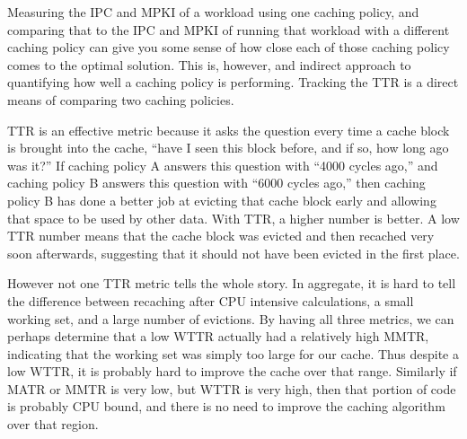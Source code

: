 Measuring the IPC and MPKI of a workload using one caching policy,
 and comparing that to the IPC and MPKI of running that workload with a different caching policy can give you some sense of how close each of those caching policy comes to the optimal solution.
This is, however, and indirect approach to quantifying how well a caching policy is performing.
Tracking the TTR is a direct means of comparing two caching policies.

TTR is an effective metric because it asks the question every time a cache block is brought into the cache,
 ``have I seen this block before, and if so, how long ago was it?''
If caching policy A answers this question with ``4000 cycles ago,''
 and caching policy B answers this question with ``6000 cycles ago,''
 then caching policy B has done a better job at evicting that cache block early and allowing that space to be used by other data.
With TTR, a higher number is better.
A low TTR number means that the cache block was evicted and then recached very soon afterwards,
 suggesting that it should not have been evicted in the first place.

However not one TTR metric tells the whole story.
In aggregate, it is hard to tell the difference between recaching after CPU intensive calculations, a small working set, and a large number of evictions.
By having all three metrics, we can perhaps determine that a low WTTR actually had a relatively high MMTR, indicating that the working set was simply too large for our cache.
Thus despite a low WTTR, it is probably hard to improve the cache over that range.
Similarly if MATR or MMTR is very low, but WTTR is very high, then that portion of code is probably CPU bound, and there is no need to improve the caching algorithm over that region.

